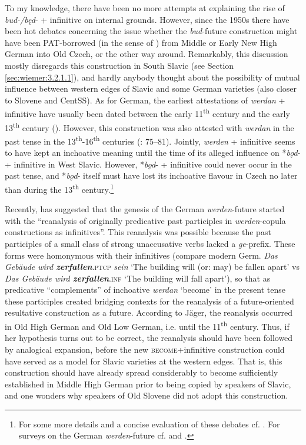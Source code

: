 \documentclass[output=paper,colorlinks,citecolor=brown]{langscibook}
\begin{document}
To my knowledge, there have been no more attempts at explaining the rise of \textit{bud-/będ}- + infinitive on internal grounds. However, since the 1950s there have been hot debates concerning the issue whether the \textit{bud}-future construction might have been PAT-borrowed (in the sense of \cite{MatrasSakel2007}) from Middle or Early New High German into Old Czech, or the other way around. Remarkably, this discussion mostly disregards this construction in South Slavic (see Section \ref{sec:wiemer:3.2.1.1}), and hardly anybody thought about the possibility of mutual influence between western edges of Slavic and some German varieties (also closer to Slovene and CentSS). As for German, the earliest attestations of \textit{werdan} + infinitive have usually been dated between the early 11\textsuperscript{th} century and the early 13\textsuperscript{th} century (\cite{Westvik2000}). However, this construction was also attested with \textit{werdan} in the past tense in the 13\textsuperscript{th}-16\textsuperscript{th} centuries (\cite{Kraemer2005}: 75--81). Jointly, \textit{werden} + infinitive seems to have kept an inchoative meaning until the time of its alleged influence on *\textit{bǫd}- + infinitive in West Slavic. However, *\textit{bǫd}- + infinitive could never occur in the past tense, and *\textit{bǫd}- itself must have lost its inchoative flavour in Czech no later than during the 13\textsuperscript{th} century.\footnote{For some more details and a concise evaluation of these debates cf. \citet[105--108]{wiemer_hansen_2012}. For surveys on the German \textit{werden}-future cf. \citet[Section \ref{sec:wiemer:2}]{Hartmann2021} and \citet[Section \ref{sec:wiemer:2}]{Jäger2024}.}

Recently, \citet{Jäger2024} has suggested that the genesis of the German \textit{werden}-future started with the ``reanalysis of originally predicative past participles in \textit{werden}-copula constructions as infinitives''. This reanalysis was possible because the past participles of a small class of strong unaccusative verbs lacked a \textit{ge}-prefix. These forms were homonymous with their infinitives (compare modern Germ. \textit{Das Gebäude wird\textbf{ zerfallen}}.\textsc{ptcp} \textit{sein} ‘The building will (or: may) be fallen apart’ vs \textit{Das Gebäude wird \textbf{zerfallen}}.\textsc{inf} ‘The building will fall apart’), so that as predicative “complements” of inchoative \textit{werdan} ‘become’ in the present tense these participles created bridging contexts for the reanalysis of a future-oriented resultative construction as a future. According to Jäger, the reanalysis occurred in Old High German and Old Low German, i.e. until the 11\textsuperscript{th} century. Thus, if her hypothesis turns out to be correct, the reanalysis should have been followed by analogical expansion, before the new \textsc{become}+infinitive construction could have served as a model for Slavic varieties at the western edges. That is, this construction should have already spread considerably to become sufficiently established in Middle High German prior to being copied by speakers of Slavic, and one wonders why speakers of Old Slovene did not adopt this construction. 
\end{document}
